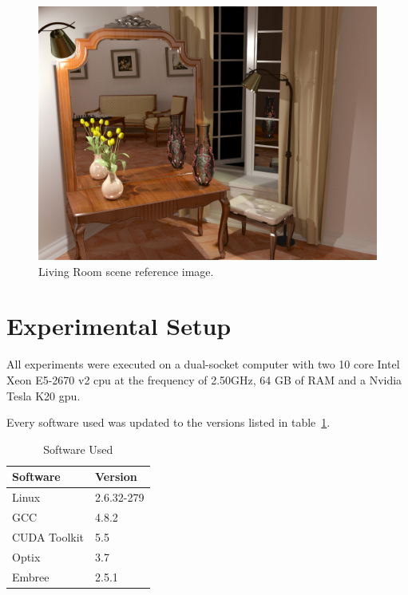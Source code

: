 \begin{figure}[h]
\begin{minipage}[b]{0.3\linewidth}
\includegraphics[width=\linewidth]{img/livingroom_ref.jpg}
\caption{\label{img:livingroom_ref} Living Room scene reference image.}
\end{minipage}

\end{figure}

\section{Experimental Setup}

All experiments were executed on a dual-socket computer with two 10 core Intel Xeon E5-2670 v2 \gls{cpu} at the frequency of 2.50GHz, 64 GB of RAM and a Nvidia Tesla K20 \gls{gpu}.

Every software used was updated to the versions listed in table~\ref{tab:soft_ver}.

\begin{table}[h]
\centering
\begin{tabular}{|l|l|}

\hline
Software & Version \\
\hline
Linux & 2.6.32-279 \\
\hline
GCC & 4.8.2 \\
\hline
CUDA Toolkit & 5.5 \\
\hline
Optix & 3.7 \\
\hline
Embree & 2.5.1 \\
\hline

\end{tabular}
\caption{\label{tab:soft_ver} Software Used}
\end{table}

